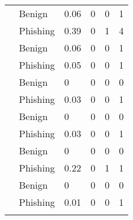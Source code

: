 \begin{singlespace}
\begin{table}[h!]
\begin{center}
\begin{tabular}{ m{7.9em} m{3.8em} m{3.4em} m{3.3em} m{7em} m{7em}}
				     & Benign         & 0.06             & 0               & 0                        & 1                        \\ & Phishing &0.39 &  0&1 & 4     \\  \addlinespace  \addlinespace

				    & Benign         & 0.06             & 0               & 0                        & 1                        \\ & Phishing &0.05 &  0&0 & 1     \\  \addlinespace  \addlinespace

				       & Benign         & 0                & 0               & 0                        & 0                        \\ & Phishing &0.03 &  0&0 & 1     \\  \addlinespace  \addlinespace

				       & Benign         & 0                & 0               & 0                        & 0                        \\ & Phishing & 0.03 &  0&0 & 1     \\  \addlinespace  \addlinespace

				      & Benign         & 0                & 0               & 0                        & 0                        \\ & Phishing &0.22 &  0&1 & 1     \\  \addlinespace  \addlinespace
				 & Benign         & 0                & 0               & 0                        & 0                        \\ & Phishing &0.01 &  0&0 & 1     \\  \addlinespace  \addlinespace


\end{tabular}
\end{center}
\end{table}
\end{singlespace}
